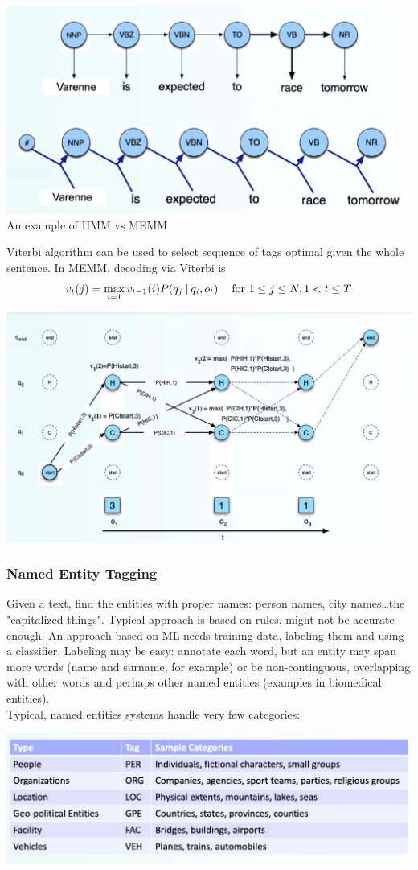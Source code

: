 \documentclass[10pt]{report}
\begin{document}
\begin{center}
	\includegraphics[scale=0.33]{18.png}\\
	An example of HMM vs MEMM
\end{center}
Viterbi algorithm can be used to select sequence of tags optimal given the whole sentence. In MEMM, decoding via Viterbi is
$$v_t(j) = \max_{i=1} v_{t-1}(i)P(q_j\:|\:q_i, o_t)\:\:\:\:\hbox{ for } 1\leq j\leq N, 1< t\leq T$$
\begin{center}
	\includegraphics[scale=0.5]{19.png}
\end{center}
\subsubsection{Named Entity Tagging}
Given a text, find the entities with proper names: person names, city names\ldots the "capitalized things". Typical approach is based on rules, might not be accurate enough. An approach based on ML needs training data, labeling them and using a classifier. Labeling may be easy: annotate each word, but an entity may span more words (name and surname, for example) or be non-continguous, overlapping with other words and perhaps other named entities (examples in biomedical entities).\\
Typical, named entities systems handle very few categories:
\begin{center}
	\includegraphics[scale=0.33]{20.png} %
\end{center}
\end{document}
